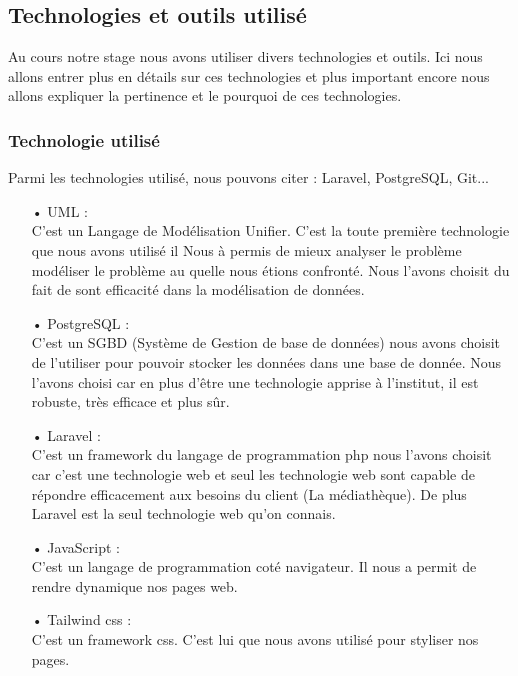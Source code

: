 \documentclass[12pt,a4paper]{article}
\begin{document}
\subsection{Technologies et outils utilisé}
Au cours notre stage nous avons utiliser divers technologies et outils. Ici nous allons 
entrer plus en détails sur ces technologies et plus important encore nous allons 
expliquer la pertinence et le pourquoi de ces technologies.\\
\subsubsection{Technologie utilisé}
Parmi les technologies utilisé, nous pouvons citer : Laravel, PostgreSQL, Git...
\begin{itemize}
\item[•] UML : \\
C'est un Langage de Modélisation Unifier. C'est la toute première technologie que nous avons
utilisé il Nous à permis de mieux analyser le problème modéliser le problème au quelle
nous étions confronté. Nous l'avons choisit du fait de sont efficacité dans la modélisation
de données.
\item[•] PostgreSQL : \\
C'est un SGBD (Système de Gestion de base de données) nous avons choisit de l'utiliser
pour pouvoir stocker les données dans une base de donnée. Nous l'avons choisi car en
plus d'être une technologie apprise à l'institut, il est robuste, très efficace et plus
sûr.
\item[•] Laravel : \\
C'est un framework du langage de programmation php nous l'avons choisit car c'est une
technologie web et seul les technologie web sont capable de répondre efficacement aux besoins du
client (La médiathèque). De plus Laravel est la seul technologie web qu'on connais.
\item[•] JavaScript : \\
C'est un langage de programmation coté navigateur. Il nous a permit de rendre dynamique nos pages
web.
\item[•] Tailwind css : \\
C'est un framework css. C'est lui que nous avons utilisé pour styliser nos pages.
\end{itemize}
\end{document}
